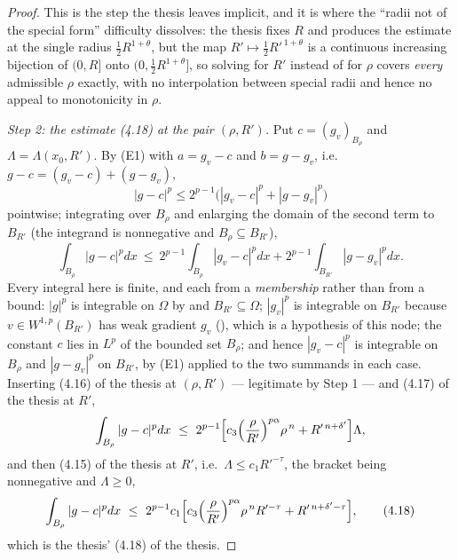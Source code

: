 \begin{proof}
This is the step the thesis leaves implicit, and it is where the ``radii not of
the special form'' difficulty dissolves: the thesis fixes $R$ and produces the
estimate at the single radius $\frac12R^{1+\theta}$, but the map
$R'\mapsto\frac12R'^{\,1+\theta}$ is a continuous increasing bijection of
$(0,R]$ onto $(0,\frac12R^{1+\theta}]$, so solving for $R'$ instead of for
$\rho$ covers \emph{every} admissible $\rho$ exactly, with no interpolation
between special radii and hence no appeal to monotonicity in $\rho$.

\emph{Step 2: the estimate (4.18) at the pair $(\rho,R')$.}  Put
$c=(g_v)_{B_\rho}$ and $\Lambda=\Lambda(x_0,R')$.  By (E1) with
$a=g_v-c$ and $b=g-g_v$, i.e.\ $g-c=(g_v-c)+(g-g_v)$,
\[
|g-c|^{p}\le2^{p-1}\bigl(|g_v-c|^{p}+|g-g_v|^{p}\bigr)
\]
pointwise; integrating over $B_\rho$ and enlarging the domain of the second term
to $B_{R'}$ (the integrand is nonnegative and $B_\rho\subseteq B_{R'}$),
\[
\int_{B_\rho}|g-c|^{p}dx
\ \le\ 2^{p-1}\int_{B_\rho}|g_v-c|^{p}dx+2^{p-1}\int_{B_{R'}}|g-g_v|^{p}dx .
\]
Every integral here is finite, and each from a \emph{membership} rather than
from a bound: $|g|^{p}$ is integrable on $\Omega$ by  and
$B_{R'}\subseteq\Omega$; $|g_v|^{p}$ is integrable on $B_{R'}$ because
$v\in W^{1,p}(B_{R'})$ has weak gradient $g_v$ (), which is a
hypothesis of this node; the constant $c$ lies in $L^p$ of the bounded set
$B_\rho$; and hence $|g_v-c|^{p}$ is integrable on $B_\rho$ and $|g-g_v|^{p}$ on
$B_{R'}$, by (E1) applied to the two summands in each case.  Inserting
(4.16) of the thesis at $(\rho,R')$ --- legitimate by Step 1 --- and
(4.17) of the thesis at $R'$,
\[
\int_{B_\rho}|g-c|^{p}dx
\ \le\ 2^{p-1}\Bigl[c_3\Bigl(\frac\rho{R'}\Bigr)^{p\alpha}\rho^{\,n}
+R'^{\,n+\delta'}\Bigr]\Lambda ,
\]
and then (4.15) of the thesis at $R'$, i.e.\ $\Lambda\le c_1R'^{-\tau}$, the bracket
being nonnegative and $\Lambda\ge0$,
\[
\int_{B_\rho}|g-c|^{p}dx
\ \le\ 2^{p-1}c_1\Bigl[c_3\Bigl(\frac\rho{R'}\Bigr)^{p\alpha}\rho^{\,n}R'^{-\tau}
+R'^{\,n+\delta'-\tau}\Bigr],
\tag{4.18}
\]
which is the thesis' (4.18) of the thesis.


\end{proof}
